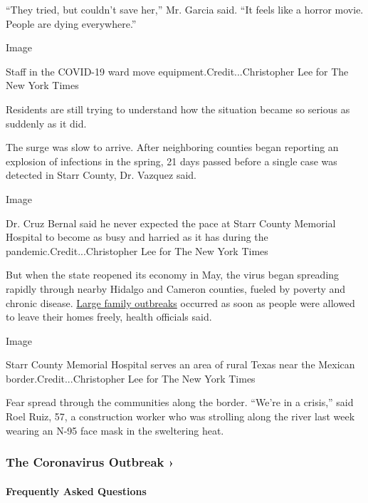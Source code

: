 ``They tried, but couldn't save her,'' Mr. Garcia said. ``It feels like
a horror movie. People are dying everywhere.''

Image

Staff in the COVID-19 ward move equipment.Credit...Christopher Lee for
The New York Times

Residents are still trying to understand how the situation became so
serious as suddenly as it did.

The surge was slow to arrive. After neighboring counties began reporting
an explosion of infections in the spring, 21 days passed before a single
case was detected in Starr County, Dr. Vazquez said.

Image

Dr. Cruz Bernal said he never expected the pace at Starr County Memorial
Hospital to become as busy and harried as it has during the
pandemic.Credit...Christopher Lee for The New York Times

But when the state reopened its economy in May, the virus began
spreading rapidly through nearby Hidalgo and Cameron counties, fueled by
poverty and chronic disease.
\href{https://www.nytimes.com/2020/07/14/us/coronavirus-texas-rio-grande-valley-border.html}{Large
family outbreaks} occurred as soon as people were allowed to leave their
homes freely, health officials said.

Image

Starr County Memorial Hospital serves an area of rural Texas near the
Mexican border.Credit...Christopher Lee for The New York Times

Fear spread through the communities along the border. ``We're in a
crisis,'' said Roel Ruiz, 57, a construction worker who was strolling
along the river last week wearing an N-95 face mask in the sweltering
heat.

\href{https://www.nytimes.com/news-event/coronavirus?action=click\&pgtype=Article\&state=default\&region=MAIN_CONTENT_3\&context=storylines_faq}{}

\hypertarget{the-coronavirus-outbreak-}{%
\subsubsection{The Coronavirus Outbreak
›}\label{the-coronavirus-outbreak-}}

\hypertarget{frequently-asked-questions}{%
\paragraph{Frequently Asked
Questions}\label{frequently-asked-questions}}

